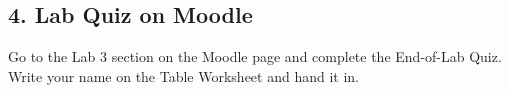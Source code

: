 \documentclass[main.tex]{subfiles}
\begin{document}
\subsection*{4. Lab Quiz on Moodle}
Go to the Lab 3 section on the Moodle page and complete the End-of-Lab Quiz. Write your name on the Table Worksheet and hand it in.


\end{document}
